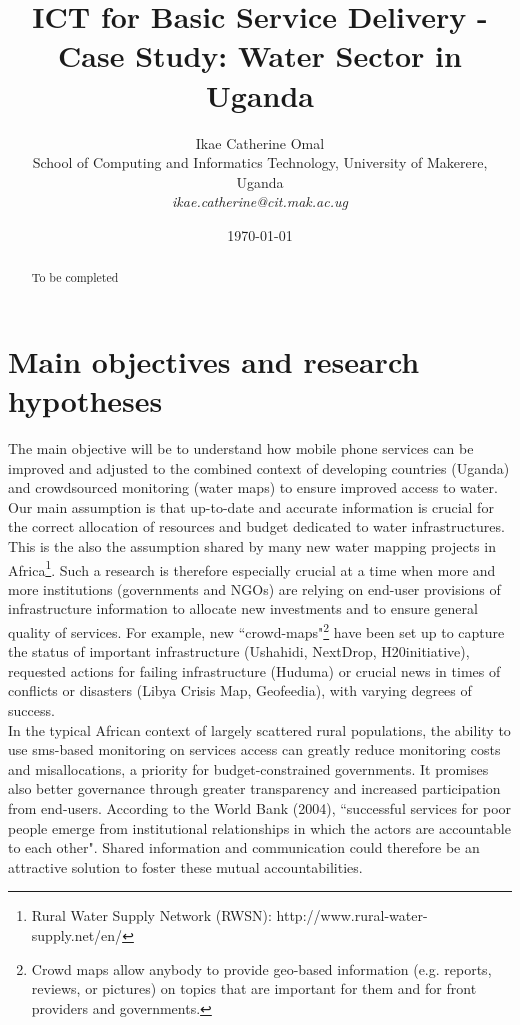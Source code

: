 \documentclass[11pt]{article}
\title{ICT for Basic Service Delivery - Case Study: Water Sector in Uganda}
\author{
\small{Ikae Catherine Omal}\\
\small{School of Computing and Informatics Technology, University of Makerere, Uganda}\\ \small{\textit{ikae.catherine@cit.mak.ac.ug}}\\
}
\date{\today}
\begin{document}
\maketitle

\begin{abstract}
To be completed
\end{abstract}



\section{Main objectives and research hypotheses}\label{objectives}
The main objective will be to understand how mobile phone services can be improved and adjusted to the combined context of developing countries (Uganda) and crowdsourced monitoring (water maps) to ensure improved access to water. Our main assumption is that up-to-date and accurate information is crucial for the correct allocation of resources and budget dedicated to water infrastructures. This is the also the assumption shared by many new water mapping projects in Africa\footnote{Rural Water Supply Network (RWSN): http://www.rural-water-supply.net/en/}. Such a research is therefore especially crucial at a time when more and more institutions (governments and NGOs) are relying on end-user provisions of infrastructure information to allocate new investments and to ensure general quality of services. For example, new ``crowd-­maps"\footnote{Crowd maps allow anybody to provide geo-­based information (e.g. reports, reviews, or pictures) on topics that are important for them and for front providers and governments.} have been set up to capture the status of important infrastructure (Ushahidi, NextDrop, H20initiative), requested actions for failing infrastructure (Huduma) or crucial news in times of conflicts or disasters (Libya Crisis Map, Geofeedia), with varying degrees of success. 
\\
In the typical African context of largely scattered rural populations, the ability to use sms-based monitoring on services access can greatly reduce monitoring costs and misallocations, a priority for budget-constrained governments. It promises also better governance through greater transparency and increased participation from end-users. According to the World Bank (2004), ``successful services for poor people emerge from institutional relationships in which the actors are accountable to each other". Shared information and communication could therefore be an attractive solution to foster these mutual accountabilities. 
\end{document}
